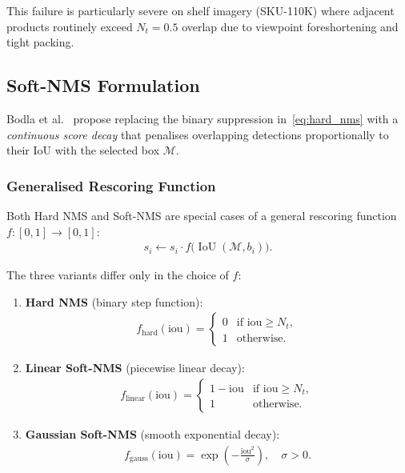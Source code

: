 \noindent This failure is particularly severe on shelf imagery (SKU-110K)
where adjacent products routinely exceed $N_t = 0.5$ overlap due to
viewpoint foreshortening and tight packing.

\subsection{Soft-NMS Formulation}
\label{ssec:soft_nms}

Bodla et al.~\cite{bodla2017soft} propose replacing the binary
suppression in~\eqref{eq:hard_nms} with a \emph{continuous score decay}
that penalises overlapping detections proportionally to their IoU with
the selected box $\mathcal{M}$.

\subsubsection{Generalised Rescoring Function}

Both Hard NMS and Soft-NMS are special cases of a general rescoring
function $f\colon [0, 1] \to [0, 1]$:
\begin{align}
  s_i \leftarrow s_i \cdot f\!\bigl(\operatorname{IoU}(\mathcal{M}, b_i)\bigr).
  \label{eq:general_rescore}
\end{align}

\noindent The three variants differ only in the choice of $f$:

\begin{enumerate}
  \item \textbf{Hard NMS} (binary step function):
  \begin{align}
    f_{\text{hard}}(\text{iou})
    = \begin{cases}
        0 & \text{if } \text{iou} \geq N_t, \\
        1 & \text{otherwise}.
      \end{cases}
    \label{eq:f_hard}
  \end{align}

  \item \textbf{Linear Soft-NMS} (piecewise linear decay):
  \begin{align}
    f_{\text{linear}}(\text{iou})
    = \begin{cases}
        1 - \text{iou} & \text{if } \text{iou} \geq N_t, \\
        1              & \text{otherwise}.
      \end{cases}
    \label{eq:f_linear}
  \end{align}

  \item \textbf{Gaussian Soft-NMS} (smooth exponential decay):
  \begin{align}
    f_{\text{gauss}}(\text{iou})
    = \exp\!\left(-\frac{\text{iou}^2}{\sigma}\right),
    \quad \sigma > 0.
    \label{eq:f_gauss}
  \end{align}
\end{enumerate}

